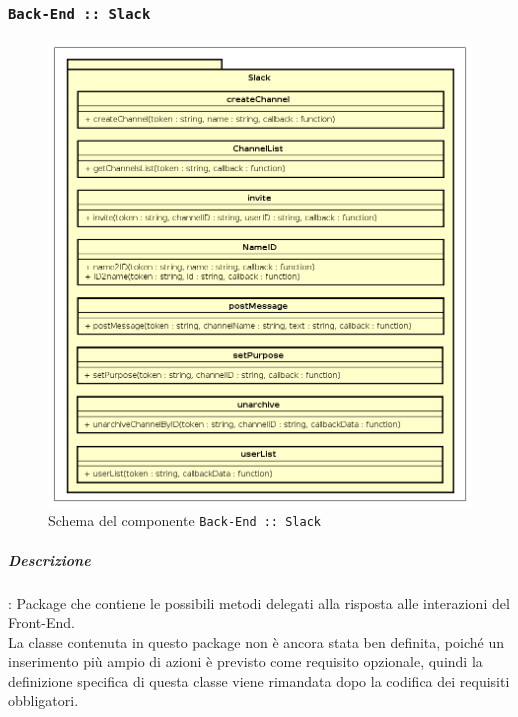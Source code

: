 \documentclass[../DefinizioneDiProdotto_v3.0.0.tex]{subfiles}
\begin{document}
\subsubsection{\texttt{Back-End :: Slack}}
\begin{figure}[!h]
	\centering
	\includegraphics[scale=0.7]{Architettura/Back-End/Slack.png}
	\caption{Schema del componente \texttt{Back-End :: Slack}}
\end{figure}
\subparagraph{Descrizione}: Package che contiene le possibili metodi delegati alla risposta alle interazioni del Front-End.\\
La classe contenuta in questo package non è ancora stata ben definita, poiché un inserimento più ampio di azioni è previsto come requisito opzionale, quindi la definizione specifica di questa classe viene rimandata dopo la codifica dei requisiti obbligatori.
\end{document}
